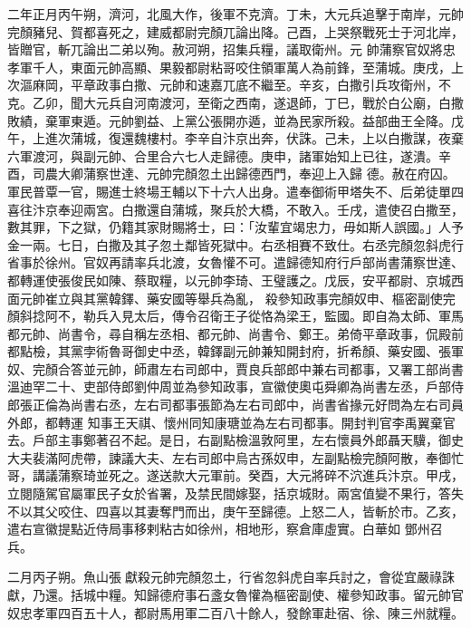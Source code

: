 \begin{pinyinscope}
 二年正月丙午朔，濟河，北風大作，後軍不克濟。丁未，大元兵追擊于南岸，元帥完顏豬兒、賀都喜死之，建威都尉完顏兀論出降。己酉，上哭祭戰死士于河北岸，皆贈官，斬兀論出二弟以殉。赦河朔，招集兵糧，議取衛州。元
 帥蒲察官奴將忠孝軍千人，東面元帥高顯、果毅都尉粘哥咬住領軍萬人為前鋒，至蒲城。庚戌，上次漚麻岡，平章政事白撒、元帥和速嘉兀底不繼至。辛亥，白撒引兵攻衛州，不克。乙卯，聞大元兵自河南渡河，至衛之西南，遂退師，丁巳，戰於白公廟，白撒敗績，棄軍東遁。元帥劉益、上黨公張開亦遁，並為民家所殺。益部曲王全降。戊午，上進次蒲城，復還魏樓村。李辛自汴京出奔，伏誅。己未，上以白撒謀，夜棄六軍渡河，與副元帥、合里合六七人走歸德。庚申，諸軍始知上已往，遂潰。辛酉，司農大卿蒲察世達、元帥完顏忽土出歸德西門，奉迎上入歸
 德。赦在府囚。軍民普覃一官，賜進士終場王輔以下十六人出身。遣奉御術甲塔失不、后弟徒單四喜往汴京奉迎兩宮。白撒還自蒲城，聚兵於大橋，不敢入。壬戌，遣使召白撒至，數其罪，下之獄，仍籍其家財賜將士，曰：「汝輩宜竭忠力，毋如斯人誤國。」人予金一兩。七日，白撒及其子忽土鄰皆死獄中。右丞相賽不致仕。右丞完顏忽斜虎行省事於徐州。官奴再請率兵北渡，女魯懽不可。遣歸德知府行戶部尚書蒲察世達、都轉運使張俊民如陳、蔡取糧，以元帥李琦、王璧護之。戊辰，安平都尉、京城西面元帥崔立與其黨韓鐸、藥安國等舉兵為亂，
 殺參知政事完顏奴申、樞密副使完顏斜捻阿不，勒兵入見太后，傳令召衛王子從恪為梁王，監國。即自為太師、軍馬都元帥、尚書令，尋自稱左丞相、都元帥、尚書令、鄭王。弟倚平章政事，侃殿前都點檢，其黨孛術魯哥御史中丞，韓鐸副元帥兼知開封府，折希顏、藥安國、張軍奴、完顏合答並元帥，師肅左右司郎中，賈良兵部郎中兼右司都事，又署工部尚書溫迪罕二十、吏部侍郎劉仲周並為參知政事，宣徽使奧屯舜卿為尚書左丞，戶部侍郎張正倫為尚書右丞，左右司都事張節為左右司郎中，尚書省掾元好問為左右司員外郎，都轉運
 知事王天祺、懷州同知康瑭並為左右司都事。開封判官李禹翼棄官去。戶部主事鄭著召不起。是日，右副點檢溫敦阿里，左右懷員外郎聶天驥，御史大夫裴滿阿虎帶，諫議大夫、左右司郎中烏古孫奴申，左副點檢完顏阿散，奉御忙哥，講議蒲察琦並死之。遂送款大元軍前。癸酉，大元將碎不泬進兵汴京。甲戌，立閱隨駕官屬軍民子女於省署，及禁民間嫁娶，括京城財。兩宮值變不果行，答失不以其父咬住、四喜以其妻奪門而出，庚午至歸德。上怒二人，皆斬於市。乙亥，遣右宣徽提點近侍局事移剌粘古如徐州，相地形，察倉庫虛實。白華如
 鄧州召兵。



 二月丙子朔。魚山張獻殺元帥完顏忽土，行省忽斜虎自率兵討之，會從宜嚴祿誅獻，乃還。括城中糧。知歸德府事石盞女魯懽為樞密副使、權參知政事。留元帥官奴忠孝軍四百五十人，都尉馬用軍二百八十餘人，發餘軍赴宿、徐、陳三州就糧。




\end{pinyinscope}
